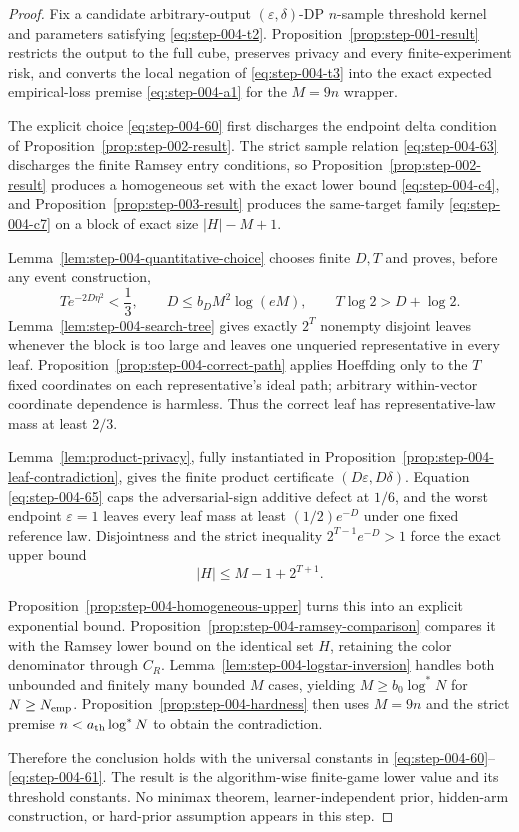 \begin{proof}

Fix a candidate arbitrary-output \((\varepsilon,\delta)\)-DP \(n\)-sample threshold kernel and parameters satisfying \eqref{eq:step-004-t2}. Proposition~\ref{prop:step-001-result} restricts the output to the full cube, preserves privacy and every finite-experiment risk, and converts the local negation of \eqref{eq:step-004-t3} into the exact expected empirical-loss premise \eqref{eq:step-004-a1} for the \(M=9n\) wrapper.

The explicit choice \eqref{eq:step-004-60} first discharges the endpoint delta condition of Proposition~\ref{prop:step-002-result}. The strict sample relation \eqref{eq:step-004-63} discharges the finite Ramsey entry conditions, so Proposition~\ref{prop:step-002-result} produces a homogeneous set with the exact lower bound \eqref{eq:step-004-c4}, and Proposition~\ref{prop:step-003-result} produces the same-target family \eqref{eq:step-004-c7} on a block of exact size \(|H|-M+1\).

Lemma~\ref{lem:step-004-quantitative-choice} chooses finite \(D,T\) and proves, before any event construction,
\[
T e^{-2D\eta^2}<\frac13,
\qquad
D\le b_DM^2\log(eM),
\qquad
T\log2>D+\log2.
\]
Lemma~\ref{lem:step-004-search-tree} gives exactly \(2^T\) nonempty disjoint leaves whenever the block is too large and leaves one unqueried representative in every leaf. Proposition~\ref{prop:step-004-correct-path} applies Hoeffding only to the \(T\) fixed coordinates on each representative's ideal path; arbitrary within-vector coordinate dependence is harmless. Thus the correct leaf has representative-law mass at least \(2/3\).

Lemma~\ref{lem:product-privacy}, fully instantiated in Proposition~\ref{prop:step-004-leaf-contradiction}, gives the finite product certificate \((D \varepsilon,D \delta)\). Equation \eqref{eq:step-004-65} caps the adversarial-sign additive defect at \(1/6\), and the worst endpoint \(\varepsilon=1\) leaves every leaf mass at least \((1/2)e^{-D}\) under one fixed reference law. Disjointness and the strict inequality \(2^{T-1}e^{-D}>1\) force the exact upper bound
\[
|H|\le M-1+2^{T+1}.
\]

Proposition~\ref{prop:step-004-homogeneous-upper} turns this into an explicit exponential bound. Proposition~\ref{prop:step-004-ramsey-comparison} compares it with the Ramsey lower bound on the identical set \(H\), retaining the color denominator through \(C_R\). Lemma~\ref{lem:step-004-logstar-inversion} handles both unbounded and finitely many bounded \(M\) cases, yielding \(M\ge b_0 \log^*N\) for \(N\ge N_{\rm emp}\). Proposition~\ref{prop:step-004-hardness} then uses \(M=9n\) and the strict premise \(n<a_{\rm th} \log^*N\) to obtain the contradiction.

Therefore the conclusion holds with the universal constants in \eqref{eq:step-004-60}--\eqref{eq:step-004-61}. The result is the algorithm-wise finite-game lower value and its threshold constants. No minimax theorem, learner-independent prior, hidden-arm construction, or hard-prior assumption appears in this step.

\end{proof}

